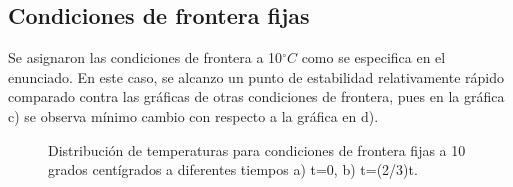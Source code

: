 \documentclass{report}
\begin{document}
\subsection*{Condiciones de frontera fijas}
Se asignaron las condiciones de frontera a  10$^{\circ}C$ como se especifica en el enunciado. En este caso, se alcanzo un punto de estabilidad relativamente rápido comparado contra las gráficas de otras condiciones de frontera, pues en la gráfica c) se observa mínimo cambio con respecto a la gráfica en d).

\begin{figure}[H]
    \centering
        \caption{Distribución de temperaturas para condiciones de frontera fijas a 10 grados centígrados a diferentes tiempos a) t=0, b) t=(2/3)t.}
    \label{fig:CondicionesFijasTemp}
\end{figure}
\end{document}
